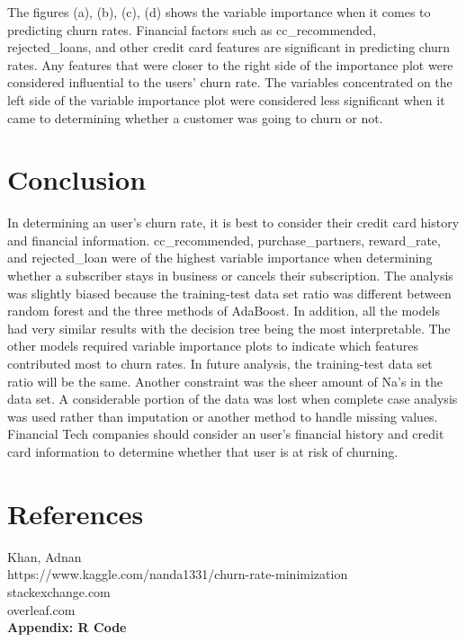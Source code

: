 \documentclass{article}\usepackage[]{graphicx}\usepackage[]{color}
\begin{document}
\qquad The figures (a), (b), (c), (d) shows the variable importance when it comes to predicting churn rates. Financial factors such as cc_recommended, rejected_loans, and other credit card features are significant in predicting churn rates. Any features that were closer to the right side of the importance plot were considered influential to the users' churn rate. The variables concentrated on the left side of the variable importance plot were considered less significant when it came to determining whether a customer was going to churn or not.


\section{Conclusion}
\qquad In determining an user's churn rate, it is best to consider their credit card history and financial information. cc_recommended, purchase_partners, reward_rate, and rejected_loan were of the highest variable importance when determining whether a subscriber stays in business or cancels their subscription. The analysis was slightly biased because the training-test data set ratio was different between random forest and the three methods of AdaBoost. In addition, all the models had very similar results with the decision tree being the most interpretable. The other models required variable importance plots to indicate which features contributed most to churn rates. In future analysis, the training-test data set ratio will be the same. Another constraint was the sheer amount of Na's in the data set. A considerable portion of the data was lost when complete case analysis was used rather than imputation or another method to handle missing values. Financial Tech companies should consider an user's financial history and credit card information to determine whether that user is at risk of churning.


\section{References}
Khan, Adnan \\
https://www.kaggle.com/nanda1331/churn-rate-minimization \\
stackexchange.com \\
overleaf.com \\

\newpage
\noindent \Large{{\bf Appendix: R Code}}

\end{document}
